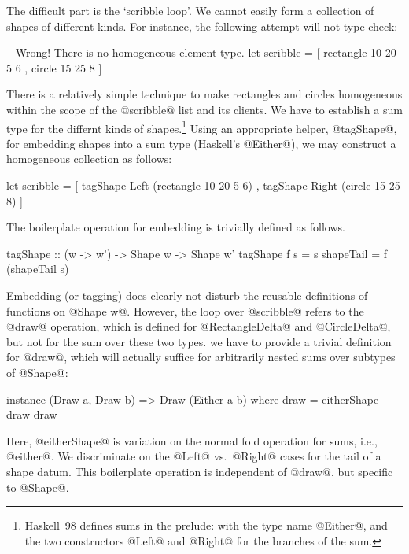 \documentclass{jfp}
\begin{document}
The difficult part is the `scribble loop'. We cannot easily form a
collection of shapes of different kinds. For instance, the following
attempt will not type-check:

\begin{code}
 -- Wrong! There is no homogeneous element type.
 let scribble = [ rectangle 10 20 5 6
                , circle 15 25 8
                ]
\end{code}

There is a relatively simple technique to make rectangles and circles
homogeneous within the scope of the @scribble@ list and its clients.
We have to establish a sum type for the differnt kinds of
shapes.\footnote{Haskell~98 defines sums in the prelude: with the type
name @Either@, and the two constructors @Left@ and @Right@ for the
branches of the sum.} Using an appropriate helper, @tagShape@, for
embedding shapes into a sum type (Haskell's @Either@), we may
construct a homogeneous collection as follows:

\begin{code}
 let scribble = [ tagShape Left  (rectangle 10 20 5 6)
                , tagShape Right (circle 15 25 8)
                ]
\end{code}

The boilerplate operation for embedding is trivially defined as follows.

\begin{code}
 tagShape :: (w -> w') -> Shape w -> Shape w'
 tagShape f s = s { shapeTail = f (shapeTail s) }
\end{code}

Embedding (or tagging) does clearly not disturb the reusable
definitions of functions on @Shape w@. However, the loop over
@scribble@ refers to the @draw@ operation, which is defined for
@RectangleDelta@ and @CircleDelta@, but not for the sum over these two
types. we have to provide a trivial definition for @draw@, which will
actually suffice for arbitrarily nested sums over subtypes of @Shape@:

\begin{code}
 instance (Draw a, Draw b) => Draw (Either a b)
  where
   draw = eitherShape draw draw
\end{code}

Here, @eitherShape@ is variation on the normal fold operation for
sums, i.e., @either@. We discriminate on the @Left@ vs.\ @Right@ cases
for the tail of a shape datum. This boilerplate operation is
independent of @draw@, but specific to @Shape@.
\end{document}
